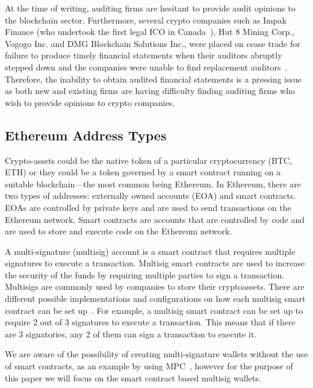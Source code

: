 At the time of writing, auditing firms are hesitant to provide audit opinions to the blockchain sector. Furthermore, several crypto companies such as Impak Finance (who undertook the first legal ICO in Canada~\cite{AMFImpactFinance}), Hut 8 Mining Corp., Vogogo Inc. and DMG Blockchain Solutions Inc., were placed on cease trade for failure to produce timely financial statements when their auditors abruptly stepped down and the companies were unable to find replacement auditors~\cite{posadzki2019crypto}. Therefore, the inability to obtain audited financial statements is a pressing issue as both new and existing firms are having difficulty finding auditing firms who wish to provide opinions to crypto companies.

\subsection{Ethereum Address Types}

Crypto-assets could be the native token of a particular cryptocurrency (\eg BTC, ETH) or they could be a token governed by a smart contract running on a suitable blockchain---the most common being Ethereum. In Ethereum, there are two types of addresses: externally owned accounts (EOA) and smart contracts. EOAs are controlled by private keys and are used to send transactions on the Ethereum network. Smart contracts are accounts that are controlled by code and are used to store and execute code on the Ethereum network. 



A multi-signature (multisig) account is a smart contract that requires multiple signatures to execute a transaction. Multisig smart contracts are used to increase the security of the funds by requiring multiple parties to sign a transaction. Multisigs are commonly used by companies to store their cryptoassets. There are different possible implementations and configurations on how each multisig smart contract can be set up~\cite{ittay2021wallet}. For example, a multisig smart contract can be set up to require 2 out of 3 signatures to execute a transaction. This means that if there are 3 signatories, any 2 of them can sign a transaction to execute it.

We are aware of the possibility of creating multi-signature wallets without the use of smart contracts, as an example by using MPC~\cite{zhao2019secure}, however for the purpose of this paper we will focus on the smart contract based multisig wallets.

